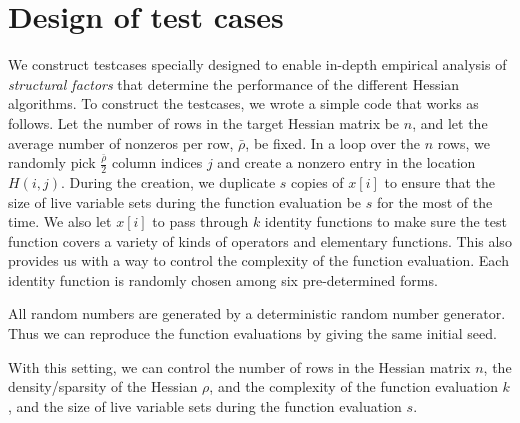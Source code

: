 \documentclass[final,leqno,onefignum,onetabnum]{siamart}
\begin{document}
\section*{Design of test cases}

We construct testcases specially designed to enable in-depth empirical analysis of {\em structural factors} that determine the performance of the  different Hessian algorithms. 
To construct the testcases, we wrote a simple code that works as follows. 
Let the number of rows in the target Hessian matrix be $n$, and let the average number of nonzeros per row, $\bar{\rho}$, be fixed.
In a loop over the $n$ rows, we randomly pick $\frac{\bar{\rho}}{2}$ column indices $j$ and create a nonzero entry in the location $H(i,j)$. During the creation, we duplicate $s$ copies of $x[i]$ to ensure that the size of live variable sets during the function evaluation be $s$ for the most of the time. We also let $x[i]$ to pass through $k$ identity functions to make sure the test function covers a variety of kinds of operators and elementary functions. This also provides us with a way to control the complexity of the function evaluation. Each identity function is randomly chosen among six pre-determined forms. 

All random numbers are generated by a deterministic random number generator. Thus we can reproduce the function evaluations by giving the same initial seed.

With this setting, we can control the number of rows in the Hessian matrix $n$, the density/sparsity of the Hessian $\rho$, and the complexity of the function evaluation $k$, and the size of live variable sets during the function evaluation $s$.
\end{document}
